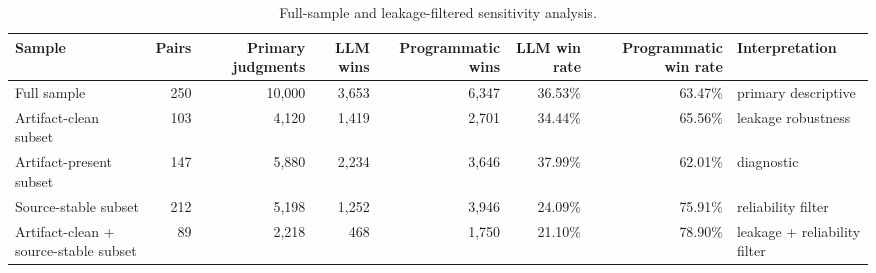 \begin{table}[t]
\centering
\scriptsize
\setlength{\tabcolsep}{3.2pt}
\begin{tabular}{lrrrrrrl}
\toprule
Sample & Pairs & Primary judgments & LLM wins & Programmatic wins & LLM win rate & Programmatic win rate & Interpretation \\
\midrule
Full sample & 250 & 10,000 & 3,653 & 6,347 & 36.53\% & 63.47\% & primary descriptive \\
Artifact-clean subset & 103 & 4,120 & 1,419 & 2,701 & 34.44\% & 65.56\% & leakage robustness \\
Artifact-present subset & 147 & 5,880 & 2,234 & 3,646 & 37.99\% & 62.01\% & diagnostic \\
Source-stable subset & 212 & 5,198 & 1,252 & 3,946 & 24.09\% & 75.91\% & reliability filter \\
Artifact-clean + source-stable subset & 89 & 2,218 & 468 & 1,750 & 21.10\% & 78.90\% & leakage + reliability filter \\
\bottomrule
\end{tabular}
\caption{Full-sample and leakage-filtered sensitivity analysis.}
\label{tab:sensitivity}
\end{table}